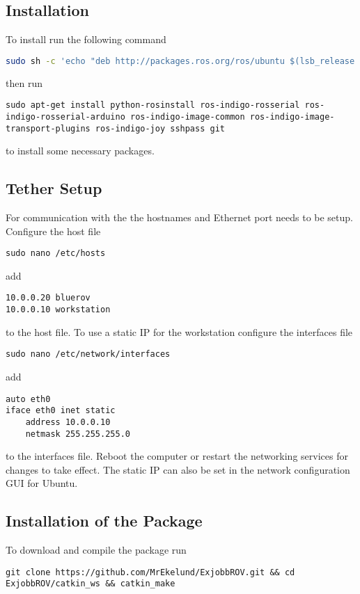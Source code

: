 \subsection{\abbrROS Installation}
To install \abbrROS run the following command
\begin{lstlisting}[language=bash]
sudo sh -c 'echo "deb http://packages.ros.org/ros/ubuntu $(lsb_release -sc) main" > /etc/apt/sources.list.d/ros-latest.list' && sudo apt-get install ros-indigo-ros-desktop-full && sudo rosdep init && rosdep update && echo "source /opt/ros/indigo/setup.bash" >> ~/.bashrc && source ~/.bashrc
\end{lstlisting}
then run 
\begin{lstlisting}
sudo apt-get install python-rosinstall ros-indigo-rosserial ros-indigo-rosserial-arduino ros-indigo-image-common ros-indigo-image-transport-plugins ros-indigo-joy sshpass git
\end{lstlisting}
to install some necessary packages.

\subsection{Tether Setup}
For communication with the \abbrROV the hostnames and Ethernet port needs to be setup.
Configure the host file 
\begin{lstlisting}
sudo nano /etc/hosts
\end{lstlisting}
add
\begin{lstlisting}
10.0.0.20 bluerov
10.0.0.10 workstation
\end{lstlisting}
to the host file. To use a static IP for the workstation configure the interfaces file
\begin{lstlisting}
sudo nano /etc/network/interfaces
\end{lstlisting}
add 
\begin{lstlisting}
auto eth0
iface eth0 inet static
    address 10.0.0.10
    netmask 255.255.255.0
\end{lstlisting}
to the interfaces file. Reboot the computer or restart the networking services for changes to take effect. The static IP can also be set in the network configuration GUI for Ubuntu.

\subsection{Installation of the \abbrROV Package}
To download and compile the package run
\begin{lstlisting}
git clone https://github.com/MrEkelund/ExjobbROV.git && cd ExjobbROV/catkin_ws && catkin_make
\end{lstlisting}